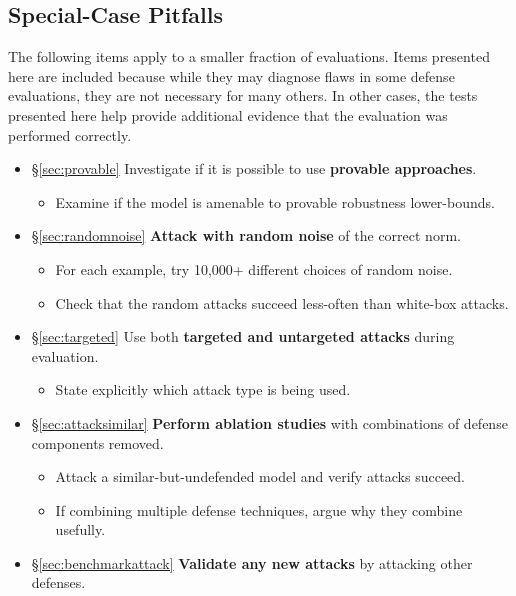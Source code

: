 \documentclass{article} %
\begin{document}
\subsection{Special-Case Pitfalls}
The following items apply to a smaller fraction of evaluations.
%
Items presented here are included because while
they may diagnose flaws in
some defense evaluations, they are not necessary for many others.
%
In other cases, the tests presented here help provide additional evidence that the
evaluation was performed correctly.

\begin{itemize}[leftmargin=*]

\item \S\ref{sec:provable} Investigate if it is possible to use \textbf{provable approaches}.
  \begin{itemize}[leftmargin=*]
    \item Examine if the model is amenable to provable robustness lower-bounds.
  \end{itemize}
\item \S\ref{sec:randomnoise} \textbf{Attack with random noise} of the correct norm.
  \begin{itemize}[leftmargin=*]
    \item For each example, try 10,000+ different choices of random noise.
    \item Check that the random attacks succeed less-often than white-box attacks.
  \end{itemize}
\item \S\ref{sec:targeted} Use both \textbf{targeted and untargeted attacks} during evaluation.
  \begin{itemize}[leftmargin=*]
    \item State explicitly which attack type is being used.
  \end{itemize}
\item \S\ref{sec:attacksimilar} \textbf{Perform ablation studies} with combinations of defense components removed.
  \begin{itemize}[leftmargin=*]
  \item Attack a similar-but-undefended model and verify attacks succeed.
  \item If combining multiple defense techniques, argue why they combine usefully.
  \end{itemize}
\item \S\ref{sec:benchmarkattack} \textbf{Validate any new attacks} by attacking other defenses.
  \begin{itemize}[leftmargin=*]

\end{itemize}
\end{itemize}
\end{document}
